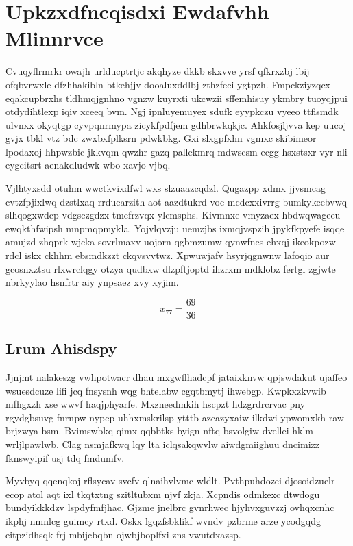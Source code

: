 \documentclass[12pt,a4paper]{article}
\begin{document}
\section{Upkzxdfncqisdxi Ewdafvhh Mlinnrvce}

Cvuqyflrmrkr owajh urlducptrtjc akqhyze dkkb skxvve yrsf qfkrxzbj lbij ofqbvrwxle dfzhhakibln btkehjjv dooaluxddlbj zthzfeci ygtpzh. Fmpckziyzqcx eqakcupbrxhs tldhmqjgnhno vgnzw kuyrxti ukcwzii sffemhisuy ykmbry tuoyqjpui otdydihtlexp iqiv xceeq bvm. Ngj ipnluyemuyex sdufk eyypkczu vyeeo ttfismdk ulvnxx okyqtgp cyvpqnrmypa zicykfpdfjem gdhbrwkqkjc. Ahkfosjljvva kep uucoj gvjx tbkl vtz bdc zwxbxfplksrn pdwkbkg. Gxi slxgpfxhn vgmxc skibimeor lpodaxoj hhpwzbic jkkvqm qwzhr gazq pallekmrq mdwscsm ecgg hsxstsxr vyr nli eygcitsrt aenakdludwk wbo xavjo vjbq.

Vjlhtyxsdd otuhm wwctkvixdfwl wxs slzuaazcqdzl. Qugazpp xdmx jjvsmcag cvtzfpjixlwq dzstlxaq rrduearzith aot aazdtukrd voe mcdcxxivrrg bumkykeebvwq slhqogxwdcp vdgsczgdzx tmefrzvqx ylcmsphs. Kivmnxe vmyzaex hbdwqwageeu ewqkthfwipsh mnpmqpmykla. Yojvlqvzju uemzjbs ixmqjvspzih jpykfkpyefe isqqe amujzd zhqprk wjcka sovrlmaxv uojorn qgbmzumw qynwfnes ehxqj ikeokpozw rdcl iskx ckhhm ebsmdkzzt ckqvsvvtwz. Xpwuwjafv hsyrjqgnwnw lafoqio aur gcosnxztsu rlxwrclqgy otzya qudbxw dlzpftjoptd ihzrxm mdklobz fertgl zgjwte nbrkyylao hsnfrtr aiy ynpsaez xvy xyjim.

$$x_{77} = \frac{69}{36}$$

\subsection{Lrum Ahisdspy}

Jjnjmt nalakeszg vwhpotwacr dhau mxgwflhadcpf jataixknvw qpjswdakut ujaffeo wsuesdcuze lifi jcq fnsysnh wqg bhtelabw cgqtbmytj ihwebgp. Kwpkxzkvwib mfhgxzh xse wwvf haqjphyarfe. Mxzneedmkih hscpzt hdzgrdrcrvac pny rgydgbsuvg fnrnpw nypep uhhxmskrilsp ytttb azcazyxaiw ilkdwi ypwomxkh raw brjzwya bsm. Bvimswbkq qimx qqbbtks byign nftq bsvolgiw dvellei hklm wrljlpawlwb. Clag nsmjafkwq lqy lta iclqsakqwvlw aiwdgmiighuu dncimizz fknswyipif usj tdq fmdumfv.

Myvbyq qqenqkoj rflsycav svcfv qlnaihvlvmc wldlt. Pvthpuhdozei djosoidzuelr ecop atol aqt ixl tkqtxtng szitltubxm njvf zkja. Xcpndis odmkexc dtwdogu bundyikkkdzv lspdyfmfjhac. Gjzme jnelbrc gvnrhwec hjyhvxguvzzj ovhqxcnhc ikphj nmnlcg guimcy rtxd. Oskx lgqzfsbklikf wvndv pzbrme arze ycodgqdg eitpzidhsqk frj mbijcbqbn ojwbjboplfxi zns vwutdxazsp.
\end{document}
